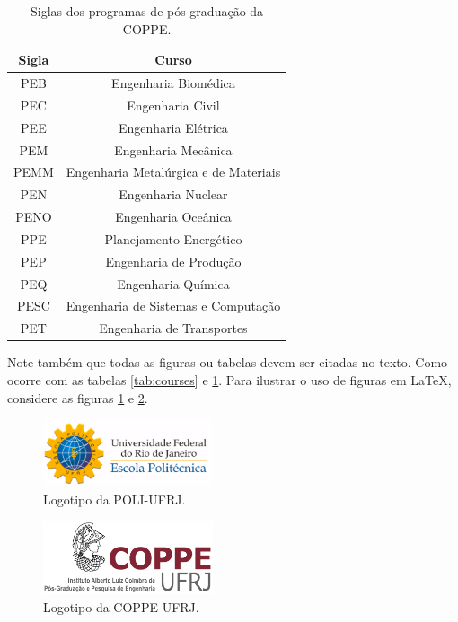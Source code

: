 \documentclass[grad,numbers]{coppe}
\begin{document}
    
  \begin{table}[h]
  	\caption{Siglas dos programas de pós graduação da COPPE.}
  	\label{tab:programs}
  	\centering
  	{\footnotesize
  	\begin{tabular}{|c|c|}
  		\hline
  		Sigla & Curso\\
  		\hline
  		PEB & Engenharia Biomédica \\
  		PEC & Engenharia Civil\\
  		PEE & Engenharia Elétrica \\
  		PEM & Engenharia Mecânica \\
  		PEMM & Engenharia Metalúrgica e de Materiais\\
  		PEN & Engenharia Nuclear\\
  		PENO & Engenharia Oceânica\\
  		PPE & Planejamento Energético\\
  		PEP & Engenharia de Produção\\
  		PEQ & Engenharia Química\\
  		PESC & Engenharia de Sistemas e Computação\\
  		PET & Engenharia de Transportes\\
  		\hline
  	\end{tabular}}
  \end{table}


  Note também que todas as figuras ou tabelas devem ser citadas no texto. Como ocorre com as tabelas \ref{tab:courses} e \ref{tab:programs}. Para ilustrar o uso de figuras em \LaTeX, considere as figuras \ref{fig:poli} e \ref{fig:coppe}.
  
   \begin{figure}
      \centering
      \includegraphics[width=5cm]{poli-logo.pdf}
      \caption{Logotipo da POLI-UFRJ.}
      \label{fig:poli}
    \end{figure}
    
    
    \begin{figure}
       \centering
       \includegraphics[width=5cm]{coppe-logo.pdf}
       \caption{Logotipo da COPPE-UFRJ.}
       \label{fig:coppe}
     \end{figure}
\end{document}

